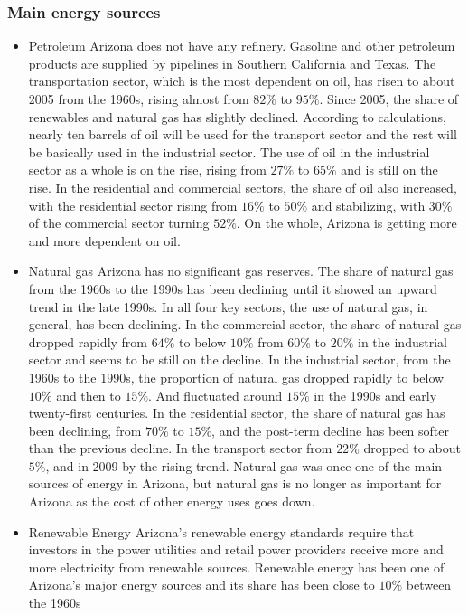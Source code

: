 \documentclass{mcmthesis}
\begin{document}
\subsubsection{Main energy sources}
\begin{itemize}
  \item Petroleum
  Arizona does not have any refinery. Gasoline and other petroleum products are supplied by pipelines in Southern California and Texas.
  The transportation sector, which is the most dependent on oil, has risen to about 2005 from the 1960s, rising almost from $82\%$ to $95\%$.
  Since 2005, the share of renewables and natural gas has slightly declined. According to calculations, nearly ten barrels of oil will be
  used for the transport sector and the rest will be basically used in the industrial sector. The use of oil in the industrial sector
  as a whole is on the rise, rising from $27\%$ to $65\%$ and is still on the rise. In the residential and commercial sectors, the share of
  oil also increased, with the residential sector rising from $16\%$ to $50\%$ and stabilizing, with $30\%$ of the commercial sector turning $52\%$.
  On the whole, Arizona is getting more and more dependent on oil.
  \item Natural gas
  Arizona has no significant gas reserves. The share of natural gas from the 1960s to the 1990s has been declining until it showed an upward
  trend in the late 1990s. In all four key sectors, the use of natural gas, in general, has been declining. In the commercial sector, the
  share of natural gas dropped rapidly from $64\%$ to below $10\%$ from $60\%$ to $20\%$ in the industrial sector and seems to be still on the decline.
  In the industrial sector, from the 1960s to the 1990s, the proportion of natural gas dropped rapidly to below $10\%$ and then to $15\%$.
  And fluctuated around $15\%$ in the 1990s and early twenty-first centuries. In the residential sector, the share of natural gas has been declining,
  from $70\%$ to $15\%$, and the post-term decline has been softer than the previous decline. In the transport sector from
  $22\%$ dropped to about $5\%$, and in 2009 by the rising trend. Natural gas was once one of the main sources of energy in Arizona, but natural
  gas is no longer as important for Arizona as the cost of other energy uses goes down.
  \item Renewable Energy
  Arizona's renewable energy standards require that investors in the power utilities and retail power providers receive more and more electricity
  from renewable sources. Renewable energy has been one of Arizona's major energy sources and its share has been close to $10\%$ between the 1960s

\end{itemize}
\end{document}

